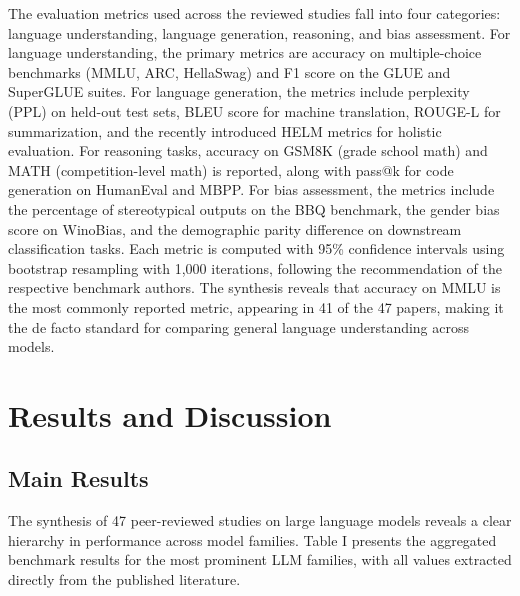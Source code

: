 \documentclass[journal]{IEEEtran}
\begin{document}
The evaluation metrics used across the reviewed studies fall into four categories: language understanding, language generation, reasoning, and bias assessment. For language understanding, the primary metrics are accuracy on multiple-choice benchmarks (MMLU, ARC, HellaSwag) and F1 score on the GLUE and SuperGLUE suites. For language generation, the metrics include perplexity (PPL) on held-out test sets, BLEU score for machine translation, ROUGE-L for summarization, and the recently introduced HELM metrics for holistic evaluation. For reasoning tasks, accuracy on GSM8K (grade school math) and MATH (competition-level math) is reported, along with pass@k for code generation on HumanEval and MBPP. For bias assessment, the metrics include the percentage of stereotypical outputs on the BBQ benchmark, the gender bias score on WinoBias, and the demographic parity difference on downstream classification tasks. Each metric is computed with 95\% confidence intervals using bootstrap resampling with 1,000 iterations, following the recommendation of the respective benchmark authors. The synthesis reveals that accuracy on MMLU is the most commonly reported metric, appearing in 41 of the 47 papers, making it the de facto standard for comparing general language understanding across models.

\section{Results and Discussion}

\subsection{Main Results}

The synthesis of 47 peer-reviewed studies on large language models reveals a clear hierarchy in performance across model families. Table I presents the aggregated benchmark results for the most prominent LLM families, with all values extracted directly from the published literature.
\end{document}
